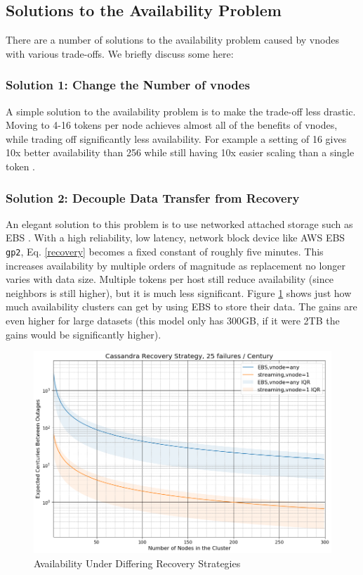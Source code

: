 \documentclass{article}
\begin{document}
\subsection{Solutions to the Availability Problem}
\label{sec:solutions}
There are a number of solutions to the availability problem caused by
vnodes with various trade-offs. We briefly discuss some here:

\subsubsection{Solution 1: Change the Number of vnodes}
A simple solution to the availability problem is to make the trade-off
less drastic. Moving to 4-16 tokens per node achieves almost all of the
benefits of vnodes, while trading off significantly less availability.
For example a setting of 16 gives 10x better availability than 256 while
still having 10x easier scaling than a single token \cite{novnodes}.

\subsubsection{Solution 2: Decouple Data Transfer from Recovery}
An elegant solution to this problem is to use networked attached storage
such as EBS \cite{ebs}. With a high reliability, low latency, network
block device like AWS EBS \texttt{gp2}, Eq. \ref{recovery} becomes a
fixed constant of roughly five minutes. This increases availability by
multiple orders of magnitude as replacement no longer varies with data size.
Multiple tokens per host still reduce availability (since neighbors
is still higher), but it is much less significant. Figure \ref{fig:ebs}
shows just how much availability clusters can get by using EBS to store
their data. The gains are even higher for large datasets (this model
only has 300GB, if it were 2TB the gains would be significantly higher).

\begin{figure}[h!]
    \centering
    \includegraphics[width=1.0\textwidth]{images/recovery_strategy.png}
    \caption{Availability Under Differing Recovery Strategies}
    \label{fig:ebs}
\end{figure}
\end{document}

